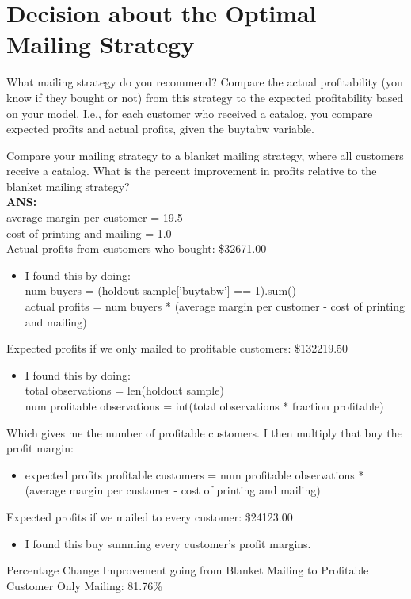 \documentclass[a4paper,12pt]{article}
\begin{document}
\section{Decision about the Optimal Mailing Strategy}
What mailing strategy do you recommend? Compare the actual profitability 
(you know if they bought or not) from this strategy to the expected profitability based on 
your model. I.e., for each customer who received a catalog, you compare expected profits 
and actual profits, given the buytabw variable.

Compare your mailing strategy to a blanket mailing strategy, where all customers
receive a catalog. What is the percent improvement in profits relative to the blanket
mailing strategy? \\

\textbf{ANS:}\\
average margin per customer = 19.5\\
\vspace{12pt}
cost of printing and mailing = 1.0\\
Actual profits from customers who bought: \$32671.00\\
\begin{itemize}
\item I found this by doing: \\
num buyers = (holdout sample['buytabw'] == 1).sum()\\
actual profits = num buyers * (average margin per customer - cost of printing and mailing)\\
\end{itemize}
Expected profits if we only mailed to profitable customers: \$132219.50\\
\begin{itemize}
\item I found this by doing:\\
total observations = len(holdout sample)\\
num profitable observations = int(total observations * fraction profitable)\\
\end{itemize}
Which gives me the number of profitable customers. I then multiply that buy the profit margin:\\
\begin{itemize}
\item expected profits profitable customers = num profitable observations *\\
(average margin per customer - cost of printing and mailing)\\
\end{itemize}
Expected profits if we mailed to every customer: \$24123.00\\
\begin{itemize}
\item I found this buy summing every customer's profit margins.\\
\end{itemize}
Percentage Change Improvement going from Blanket Mailing to Profitable Customer Only Mailing: 81.76\%
\end{document}
